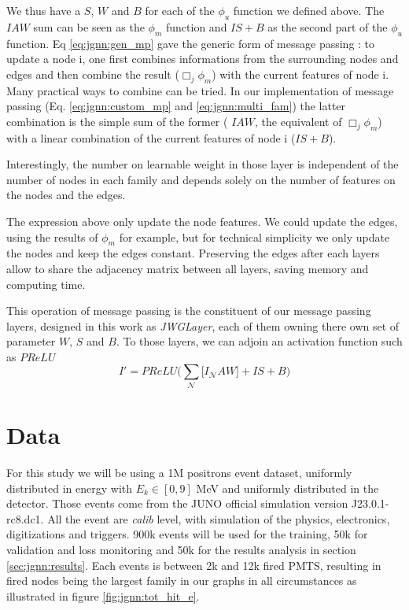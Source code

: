 \documentclass[../main.tex]{subfiles}
\begin{document}
We thus have a $S$, $W$ and $B$ for each of the $\phi_u$ function we defined above. The $IAW$ sum can be seen as the $\phi_m$ function and $IS+B$ as the second part of the $\phi_u$ function.
Eq \ref{eq:jgnn:gen_mp} gave the generic form of message passing : to update a node i, one first combines  informations from the surrounding nodes and edges and then combine the result ($\Box_j \phi_m$) with the current features of node i.
Many practical ways to combine can be tried. In our implementation of message passing (Eq. \ref{eq:jgnn:custom_mp} and \ref{eq:jgnn:multi_fam}) the latter combination is the simple sum of the former ( $IAW$, the equivalent of $\Box_j \phi_m$) with a linear combination of the current features of node i ($IS+B$).

Interestingly, the number on learnable weight in those layer is independent of the number of nodes in each family and depends solely on the number of features on the nodes and the edges.

The expression above only update the node features. We could update the edges, using the results of $\phi_m$ for example, but for technical simplicity we only update the nodes and keep the edges constant. Preserving the edges after each layers allow to share the adjacency matrix between all layers, saving memory and computing time.

This operation of message passing is the constituent of our message passing layers, designed in this work as \textit{JWGLayer}, each of them owning there own set of parameter $W$, $S$ and $B$. To those layers, we can adjoin an activation function such as $PReLU$
\begin{equation}
  I' = PReLU\bigg(\sum_\mathcal{N} \bigg[ I_{\mathcal{N}}AW \bigg] + IS + B \bigg)
\end{equation}


\section{Data}

For this study we will be using a 1M positrons event dataset, uniformly distributed in energy with $E_k \in [0, 9]$ MeV and uniformly distributed in the detector. Those events come from the JUNO official simulation version J23.0.1-rc8.dc1. All the event are \textit{calib} level, with simulation of the physics, electronics, digitizations and triggers. 900k events will be used for the training, 50k for validation and loss monitoring and 50k for the results analysis in section \ref{sec:jgnn:results}. Each events is between 2k and 12k fired PMTS, resulting in fired nodes being the largest family in our graphs in all circumstances as illustrated in figure \ref{fig:jgnn:tot_hit_e}.
\end{document}
